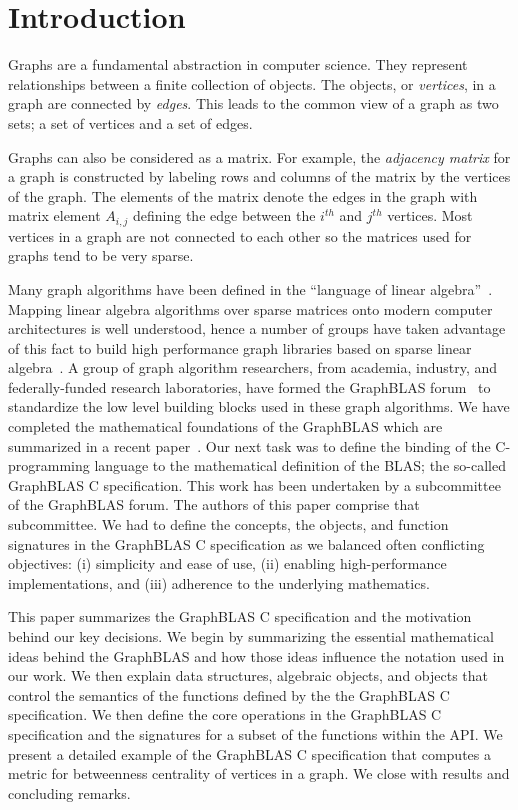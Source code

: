 \section{Introduction}
\label{sec:intro}
Graphs are a fundamental abstraction in computer science.  They represent relationships between a 
finite collection of objects.   The objects, or \emph{vertices}, in a graph are connected
by \emph{edges}.  This leads to the common view of a graph as two sets;  a set of vertices and a set of edges.  

Graphs can also be considered as a matrix.   For example, the \emph{adjacency matrix} for a graph is constructed by 
labeling rows and columns of the matrix by the vertices of the graph.  The elements of the matrix denote the 
edges in the graph with matrix element $A_{i,j}$ defining the edge between the $i^{th}$ and $j^{th}$
vertices.  Most vertices in a graph are not connected to each other so the matrices used for graphs tend to be 
very sparse.  

Many graph algorithms have been defined in the ``language of linear algebra''~\cite{kepner2011graph}.  
Mapping linear algebra algorithms over sparse matrices onto modern computer 
architectures is well understood, hence a number of groups have taken advantage of this fact
to build high performance graph libraries based on sparse linear 
algebra~\cite{combblas, gadepally2015graphulo, gpi2016, sundaram2015graphmat}.  
A group of graph algorithm researchers, from academia, industry, and federally-funded research
laboratories, have formed the GraphBLAS forum~\cite{graphblas_web} 
to standardize the low level building blocks used in these graph algorithms.   
We have completed the mathematical foundations of the GraphBLAS which are summarized
in a recent paper~\cite{mathgraphblas16}.  Our next task was to define the binding of the
C-programming language to the mathematical definition of the BLAS; the so-called 
GraphBLAS C specification.   This work has been undertaken by a subcommittee of 
the GraphBLAS forum.   The authors of this paper  comprise that subcommittee. 
We had to define the concepts, the objects, and function signatures in the GraphBLAS C specification
as we balanced often conflicting objectives: (i) simplicity and ease of use, 
(ii) enabling high-performance implementations, and (iii) adherence to the underlying mathematics. 

This paper summarizes the GraphBLAS C specification and the motivation behind 
our key decisions.  We begin by summarizing the essential mathematical
ideas behind the GraphBLAS and how those ideas influence the notation used in our work.
We then explain data structures, algebraic objects, and objects that control the semantics
of the functions defined by the the GraphBLAS C specification.   We then define the core
operations in the GraphBLAS C specification and the signatures for a subset of the 
functions  within the API.  We present a detailed example of the GraphBLAS C specification
that computes a metric for betweenness centrality of vertices in a graph.  We close with 
results and concluding remarks.

